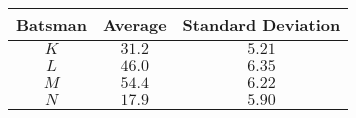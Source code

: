 \begin{tabular}[12pt]{ |c| c| c|}
    \hline
	\textbf{Batsman}  & \textbf{Average} & \textbf{Standard Deviation} \\
    \hline
	$K$ &  $31.2$ & $5.21$  \\
    \hline 
	$L$ &  $46.0$ & $6.35$\\
    \hline
	$M$ &  $54.4$ & $6.22$ \\  
    \hline
    	$N$ &  $17.9$ & $5.90$ \\
    \hline         
\end{tabular}
